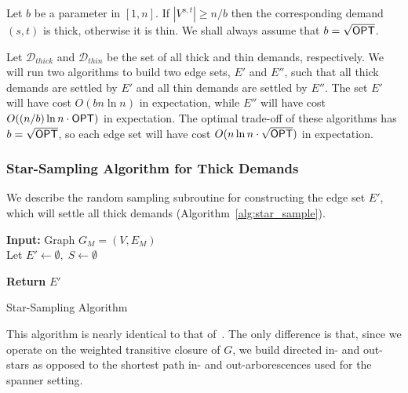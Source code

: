\begin{definition} 
    Let $b$ be a parameter in $[1,n]$. If $|V^{s,t}| \geq n/b$ then the corresponding demand $(s,t)$ is thick, otherwise it is thin. We shall always assume that $b = \sqrt{{{\sf OPT}}}$.
\end{definition}

Let $\mathcal{D}_{thick}$ and $\mathcal{D}_{thin}$ be the set of all thick and thin demands, respectively. We will run two algorithms to build two edge sets, $E'$ and $E''$, such that all thick demands are settled by $E'$ and all thin demands are settled by $E''$. The set $E'$ will have cost $O(bn\ln{n})$ in expectation, while $E''$ will have cost $O((n/b)\ln{n} \cdot {{\sf OPT}})$ in expectation. The optimal trade-off of these algorithms has $b = \sqrt{{\sf OPT}}$, so each edge set will have cost $O(n\ln{n} \cdot \sqrt{{{\sf OPT}} })$ in expectation.

\subsubsection{Star-Sampling Algorithm for Thick Demands} \label{sec:thick}
We describe the random sampling subroutine for constructing the edge set $E'$, which will settle all thick demands (Algorithm~\ref{alg:star_sample}). 

\begin{algorithm}[h]
\DontPrintSemicolon

\textbf{Input:} 
Graph $G_M = (V, E_M)$ \\

Let $E' \gets \emptyset, \; S \gets \emptyset$  

\textbf{Return} $E'$ \;

\caption{\label{alg:star_sample} Star-Sampling Algorithm}
\end{algorithm}

This algorithm is nearly identical to that of~\cite{DK11}. The only difference is that, since we operate on the weighted transitive closure of $G$, we build directed in- and out-stars as opposed to the shortest path in- and out-arborescences used for the spanner setting. 

